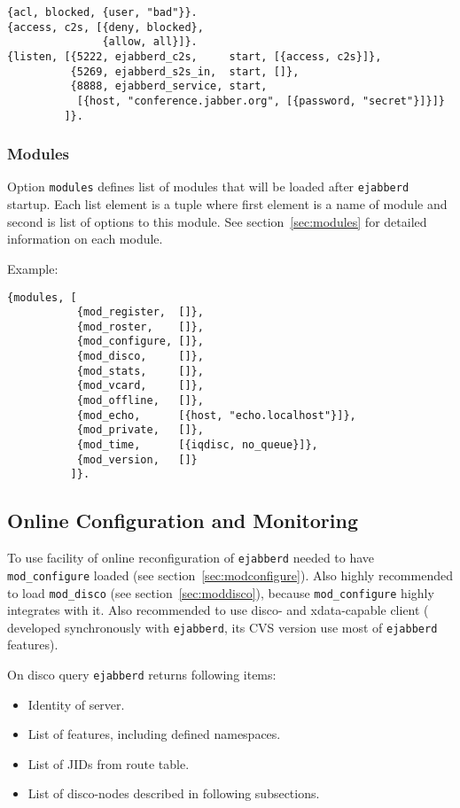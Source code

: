 \documentclass[10pt]{article}
\newcommand{\ejabberd}{\texttt{ejabberd}}
\newcommand{\modconfigure}{\texttt{mod\_configure}}
\newcommand{\moddisco}{\texttt{mod\_disco}}
\begin{document}
\begin{verbatim}
{acl, blocked, {user, "bad"}}.
{access, c2s, [{deny, blocked},
               {allow, all}]}.
{listen, [{5222, ejabberd_c2s,     start, [{access, c2s}]},
          {5269, ejabberd_s2s_in,  start, []},
          {8888, ejabberd_service, start,
           [{host, "conference.jabber.org", [{password, "secret"}]}]}
         ]}.
\end{verbatim}





\subsubsection{Modules}
\label{sec:configmodules}

Option \texttt{modules} defines list of modules that will be loaded after
\ejabberd{} startup.  Each list element is a tuple where first element is a
name of module and second is list of options to this module.  See
section~\ref{sec:modules} for detailed information on each module.

Example:
\begin{verbatim}
{modules, [
           {mod_register,  []},
           {mod_roster,    []},
           {mod_configure, []},
           {mod_disco,     []},
           {mod_stats,     []},
           {mod_vcard,     []},
           {mod_offline,   []},
           {mod_echo,      [{host, "echo.localhost"}]},
           {mod_private,   []},
           {mod_time,      [{iqdisc, no_queue}]},
           {mod_version,   []}
          ]}.
\end{verbatim}


\subsection{Online Configuration and Monitoring}
\label{sec:onlineconfig}

To use facility of online reconfiguration of \ejabberd{} needed to have
\modconfigure{} loaded (see section~\ref{sec:modconfigure}).  Also highly
recommended to load \moddisco{} (see section~\ref{sec:moddisco}), because
\modconfigure{} highly integrates with it.  Also recommended to use disco- and
xdata-capable client
(
developed synchronously with \ejabberd{}, its CVS version use most of
\ejabberd{} features).

On disco query \ejabberd{} returns following items:
\begin{itemize}
\item Identity of server.
\item List of features, including defined namespaces.
\item List of JIDs from route table.
\item List of disco-nodes described in following subsections.
\end{itemize}
\end{document}
